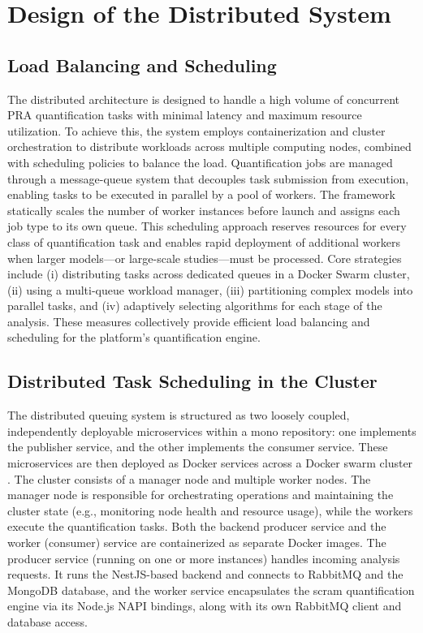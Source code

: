 

\section{Design of the Distributed System}

\subsection{Load Balancing and Scheduling}

The distributed architecture is designed to handle a high volume of concurrent PRA quantification tasks with minimal latency and maximum resource utilization. To achieve this, the system employs containerization and cluster orchestration to distribute workloads across multiple computing nodes, combined with scheduling policies to balance the load. Quantification jobs are managed through a message-queue system that decouples task submission from execution, enabling tasks to be executed in parallel by a pool of workers. The framework statically scales the number of worker instances before launch and assigns each job type to its own queue. This scheduling approach reserves resources for every class of quantification task and enables rapid deployment of additional workers when larger models—or large-scale studies—must be processed. Core strategies include (i) distributing tasks across dedicated queues in a Docker Swarm cluster, (ii) using a multi-queue workload manager, (iii) partitioning complex models into parallel tasks, and (iv) adaptively selecting algorithms for each stage of the analysis. These measures collectively provide efficient load balancing and scheduling for the platform's quantification engine.

\subsection{Distributed Task Scheduling in the Cluster}

The distributed queuing system is structured as two loosely coupled, independently deployable microservices within a mono repository: one implements the publisher service, and the other implements the consumer service. These microservices are then deployed as Docker services across a Docker swarm cluster \cite{Swarm}. The cluster consists of a manager node and multiple worker nodes. The manager node is responsible for orchestrating operations and maintaining the cluster state (e.g., monitoring node health and resource usage), while the workers execute the quantification tasks. Both the backend producer service and the worker (consumer) service are containerized as separate Docker  images. The producer service (running on one or more instances) handles incoming analysis requests. It runs the NestJS-based backend \cite{Documentation} and connects to RabbitMQ \cite{RabbitMQ} and the MongoDB \cite{MongoDB} database, and the worker service encapsulates the scram \cite{scram} quantification engine via its Node.js NAPI \cite{Node} bindings, along with its own RabbitMQ client and database access.

